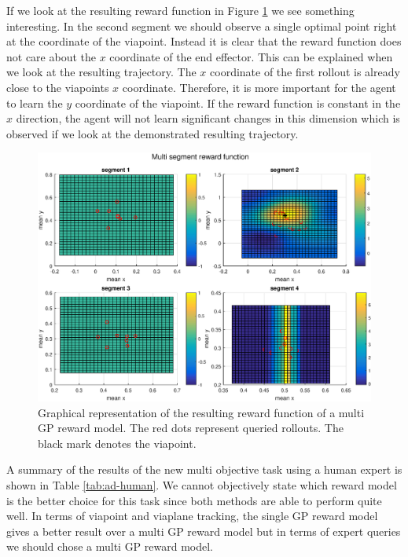 \documentclass[mscThesis.tex]{subfiles}
\begin{document}
If we look at the resulting reward function in Figure \ref{fig:adx-multi-manual-reward} we see something interesting. In the second segment we should observe a single optimal point right at the coordinate of the viapoint. Instead it is clear that the reward function does not care about the $x$ coordinate of the end effector. This can be explained when we look at the resulting trajectory. The $x$ coordinate of the first rollout is already close to the viapoints $x$ coordinate. Therefore, it is more important for the agent to learn the $y$ coordinate of the viapoint. If the reward function is constant in the $x$ direction, the agent will not learn significant changes in this dimension which is observed if we look at the demonstrated resulting trajectory.

\begin{figure}[!htb]
\centering
\includegraphics[width=\textwidth, keepaspectratio=1]{figures/results/advancedx/return_flat_multi_manual.eps}
\caption{Graphical representation of the resulting reward function of a multi GP reward model. The red dots represent queried rollouts. The black mark denotes the viapoint.}
\label{fig:adx-multi-manual-reward}
\end{figure}

A summary of the results of the new multi objective task using a human expert is shown in Table \ref{tab:ad-human}. We cannot objectively state which reward model is the better choice for this task since both methods are able to perform quite well. In terms of viapoint and viaplane tracking, the single GP reward model gives a better result over a multi GP reward model but in terms of expert queries we should chose a multi GP reward model. 
\end{document}
